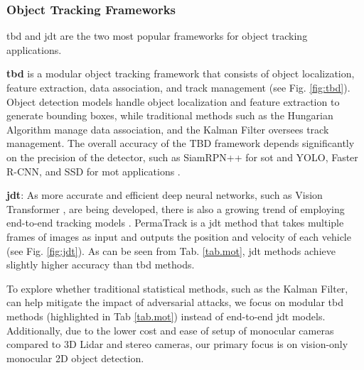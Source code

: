 
\subsubsection{Object Tracking Frameworks}
\label{sec:tracking_framework}

\acrfull{tbd} and \acrfull{jdt} are the two most popular frameworks for object tracking applications.

\textbf{\acrfull{tbd}} is a modular object tracking framework that consists of object localization, feature extraction, data association, and track management (see Fig. \ref{fig:tbd}). Object detection models handle object localization and feature extraction to generate bounding boxes, while traditional methods such as the Hungarian Algorithm manage data association, and the Kalman Filter oversees track management. The overall accuracy of the TBD framework depends significantly on the precision of the detector, such as SiamRPN++ \citep{li2019siamrpn++} for \acrshort{sot} and YOLO, Faster R-CNN, and SSD for \acrshort{mot} applications \citep{sun2020survey}.

\textbf{\acrfull{jdt}}: As more accurate and efficient deep neural networks, such as Vision Transformer \citep{dosovitskiy2020image}, are being developed, there is also a growing trend of employing end-to-end tracking models \citep{pal2021deep, guo2022review}. PermaTrack is a \acrshort{jdt} method that takes multiple frames of images as input and outputs the position and velocity of each vehicle (see Fig. \ref{fig:jdt}). As can be seen from Tab. \ref{tab.mot}, \acrshort{jdt} methods achieve slightly higher accuracy than \acrshort{tbd} methods.


To explore whether traditional statistical methods, such as the Kalman Filter, can help mitigate the impact of adversarial attacks, we focus on modular \acrshort{tbd} methods (highlighted in Tab \ref{tab.mot}) instead of end-to-end \acrshort{jdt} models. Additionally, due to the lower cost and ease of setup of monocular cameras compared to 3D Lidar and stereo cameras, our primary focus is on vision-only monocular 2D object detection.



